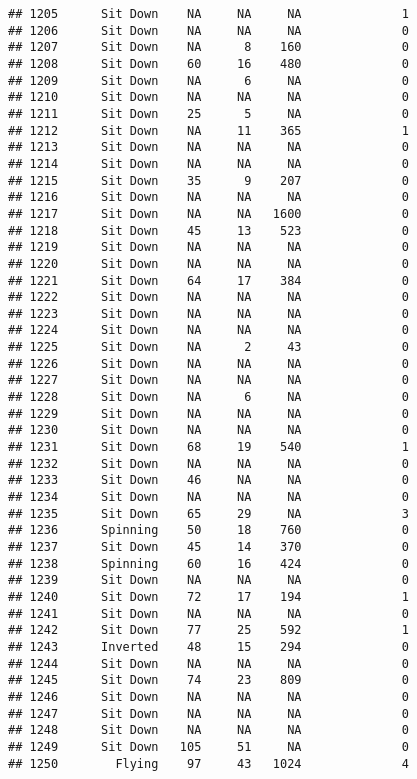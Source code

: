 \documentclass[
]{article}
\begin{document}
\begin{verbatim}
## 1205      Sit Down    NA     NA     NA              1
## 1206      Sit Down    NA     NA     NA              0
## 1207      Sit Down    NA      8    160              0
## 1208      Sit Down    60     16    480              0
## 1209      Sit Down    NA      6     NA              0
## 1210      Sit Down    NA     NA     NA              0
## 1211      Sit Down    25      5     NA              0
## 1212      Sit Down    NA     11    365              1
## 1213      Sit Down    NA     NA     NA              0
## 1214      Sit Down    NA     NA     NA              0
## 1215      Sit Down    35      9    207              0
## 1216      Sit Down    NA     NA     NA              0
## 1217      Sit Down    NA     NA   1600              0
## 1218      Sit Down    45     13    523              0
## 1219      Sit Down    NA     NA     NA              0
## 1220      Sit Down    NA     NA     NA              0
## 1221      Sit Down    64     17    384              0
## 1222      Sit Down    NA     NA     NA              0
## 1223      Sit Down    NA     NA     NA              0
## 1224      Sit Down    NA     NA     NA              0
## 1225      Sit Down    NA      2     43              0
## 1226      Sit Down    NA     NA     NA              0
## 1227      Sit Down    NA     NA     NA              0
## 1228      Sit Down    NA      6     NA              0
## 1229      Sit Down    NA     NA     NA              0
## 1230      Sit Down    NA     NA     NA              0
## 1231      Sit Down    68     19    540              1
## 1232      Sit Down    NA     NA     NA              0
## 1233      Sit Down    46     NA     NA              0
## 1234      Sit Down    NA     NA     NA              0
## 1235      Sit Down    65     29     NA              3
## 1236      Spinning    50     18    760              0
## 1237      Sit Down    45     14    370              0
## 1238      Spinning    60     16    424              0
## 1239      Sit Down    NA     NA     NA              0
## 1240      Sit Down    72     17    194              1
## 1241      Sit Down    NA     NA     NA              0
## 1242      Sit Down    77     25    592              1
## 1243      Inverted    48     15    294              0
## 1244      Sit Down    NA     NA     NA              0
## 1245      Sit Down    74     23    809              0
## 1246      Sit Down    NA     NA     NA              0
## 1247      Sit Down    NA     NA     NA              0
## 1248      Sit Down    NA     NA     NA              0
## 1249      Sit Down   105     51     NA              0
## 1250        Flying    97     43   1024              4

\end{verbatim}
\end{document}
